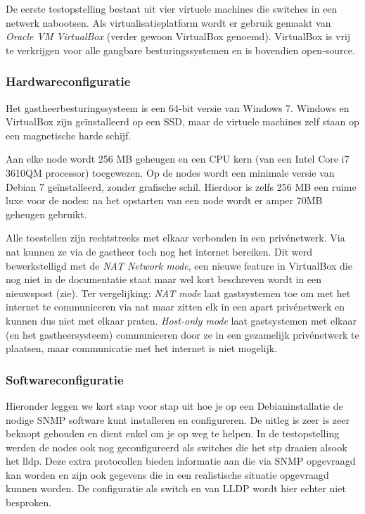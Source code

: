 De eerste testopstelling bestaat uit vier virtuele machines die switches in een netwerk nabootsen.
Als virtualisatieplatform wordt er gebruik gemaakt van \textit{Oracle VM VirtualBox} (verder gewoon VirtualBox genoemd).
VirtualBox is vrij te verkrijgen voor alle gangbare besturingssystemen en is bovendien open-source.

\subsubsection{Hardwareconfiguratie}

Het gastheerbesturingssysteem is een 64-bit versie van Windows 7.
Windows en VirtualBox zijn geïnstalleerd op een SSD, maar de virtuele machines zelf staan op een magnetische harde schijf.

Aan elke node wordt 256 MB geheugen en een CPU kern (van een Intel Core i7 3610QM processor) toegewezen.
Op de nodes wordt een minimale versie van Debian 7 geïnstalleerd, zonder grafische schil.
Hierdoor is zelfs 256 MB een ruime luxe voor de nodes: na het opstarten van een node wordt er amper 70MB geheugen gebruikt.

Alle toestellen zijn rechtstreeks met elkaar verbonden in een privénetwerk.
Via \gls{nat} kunnen ze via de gastheer toch nog het internet bereiken.
Dit werd bewerkstelligd met de \textit{NAT Network mode},
een nieuwe feature in VirtualBox die nog niet in de documentatie staat maar wel kort beschreven wordt in een nieuwspost (zie\cite{vbox-nat-network-mode}).
Ter vergelijking:
\textit{NAT mode} laat gastsystemen toe om met het internet te communiceren via \gls{nat} maar zitten elk in een apart privénetwerk en kunnen dus niet met elkaar praten.
\textit{Host-only mode} laat gastsystemen met elkaar (en het gastheersysteem) communiceren door ze in een gezamelijk privénetwerk te plaatsen, 
maar communicatie met het internet is niet mogelijk.

\subsubsection{Softwareconfiguratie}

Hieronder leggen we kort stap voor stap uit hoe je op een Debianinstallatie de nodige SNMP software kunt installeren en configureren.
De uitleg is zeer is zeer beknopt gehouden en dient enkel om je op weg te helpen.
In de testopstelling werden de nodes ook nog geconfigureerd als switches die het \gls{stp} draaien alsook het \gls{lldp}.
Deze extra protocollen bieden informatie aan die via SNMP opgevraagd kan worden en zijn ook gegevens die in een realistische situatie opgevraagd kunnen worden.
De configuratie als switch en van LLDP wordt hier echter niet besproken. 

